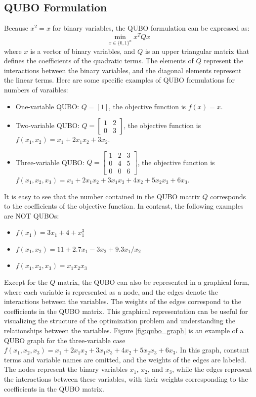 \subsection{QUBO Formulation}
Because $x^2 = x$ for binary variables, the QUBO formulation can be expressed as:
\begin{equation}
\min_{x \in \{0,1\}^n} x^T Q x
\label{eqn:qubo}
\end{equation}
where $x$ is a vector of binary variables, and $Q$ is an upper triangular matrix that defines the coefficients of the quadratic terms. The elements of $Q$ represent the interactions between the binary variables, and the diagonal elements represent the linear terms.
Here are some specific examples of QUBO formulations for numbers of varaibles:
\begin{itemize}
\item One-variable QUBO: $Q = [1]$, the objective function is $f(x) = x$.
\item Two-variable QUBO: $Q = \begin{bmatrix} 1 & 2 \\ 0 & 3 \end{bmatrix}$, the objective function is $f(x_1, x_2) = x_1 + 2x_1x_2 + 3x_2$.
\item Three-variable QUBO: $Q = \begin{bmatrix} 1 & 2 & 3 \\ 0 & 4 & 5 \\ 0 & 0 & 6 \end{bmatrix}$, the objective function is $f(x_1, x_2, x_3) = x_1 + 2x_1x_2 + 3x_1x_3 + 4x_2 + 5x_2x_3 + 6x_3$.
\end{itemize}
It is easy to see that the number contained in the QUBO matrix $Q$ corresponds to the coefficients of the objective function. In contrast, the following examples are NOT QUBOs:
\begin{itemize}
    \item $f(x_1) = 3x_1 + 4 + x_1^3$
    \item $f(x_1, x_2) = 11 + 2.7x_1 - 3x_2 + 9.3x_1/x_2$
    \item $f(x_1, x_2, x_3) = x_1x_2x_3$
\end{itemize}
Except for the $Q$ matrix, the QUBO can also be represented in a graphical form, where each variable is represented as a node, and the edges denote the interactions between the variables. The weights of the edges correspond to the coefficients in the QUBO matrix. This graphical representation can be useful for visualizing the structure of the optimization problem and understanding the relationships between the variables. Figure \ref{fig:qubo_graph} is an example of a QUBO graph for the three-variable case $f(x_1, x_2, x_3)=x_1 + 2x_1x_2 + 3x_1x_3 + 4x_2 + 5x_2x_3 + 6x_3$. In this graph, constant terms and variable names are omitted, and the weights of the edges are labeled. The nodes represent the binary variables $x_1$, $x_2$, and $x_3$, while the edges represent the interactions between these variables, with their weights corresponding to the coefficients in the QUBO matrix.
